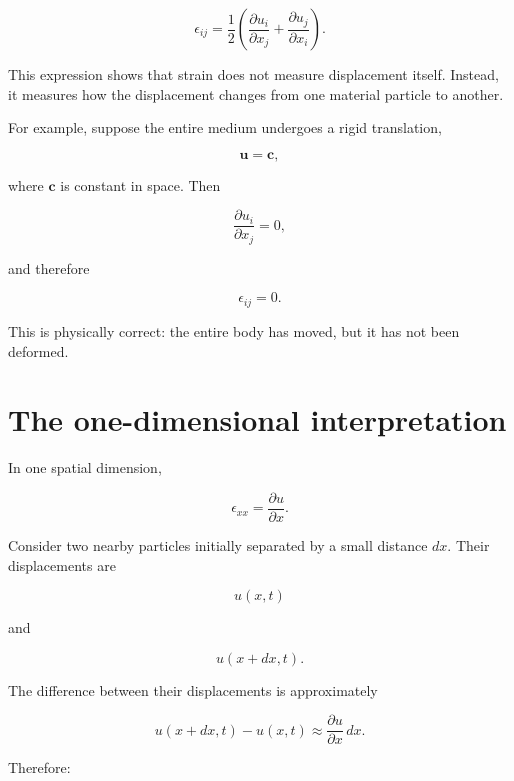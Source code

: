 \documentclass[11pt]{article}
\begin{document}
\begin{equation}
    \boxed{
    \epsilon_{ij}
    =
    \frac{1}{2}
    \left(
    \frac{\partial u_i}{\partial x_j}
    +
    \frac{\partial u_j}{\partial x_i}
    \right).
    }
\end{equation}

This expression shows that strain does not measure displacement itself. Instead, it measures how the displacement changes from one material particle to another.

For example, suppose the entire medium undergoes a rigid translation,

\begin{equation}
    \bm{u}=\bm{c},
\end{equation}

where $\bm{c}$ is constant in space. Then

\begin{equation}
    \frac{\partial u_i}{\partial x_j}=0,
\end{equation}

and therefore

\begin{equation}
    \epsilon_{ij}=0.
\end{equation}

This is physically correct: the entire body has moved, but it has not been deformed.

\section{The one-dimensional interpretation}

In one spatial dimension,

\begin{equation}
    \epsilon_{xx}
    =
    \frac{\partial u}{\partial x}.
\end{equation}

Consider two nearby particles initially separated by a small distance $dx$. Their displacements are

\[
u(x,t)
\]

and

\[
u(x+dx,t).
\]

The difference between their displacements is approximately

\begin{equation}
    u(x+dx,t)-u(x,t)
    \approx
    \frac{\partial u}{\partial x}\,dx.
\end{equation}

Therefore:
\end{document}
